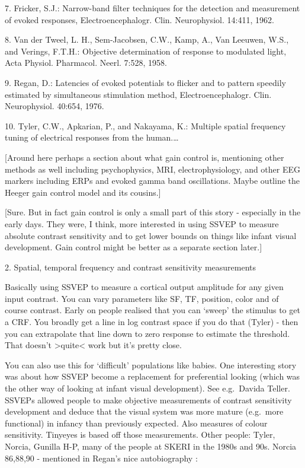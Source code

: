 \documentclass[
  letterpaper,
  DIV=11,
  numbers=noendperiod]{scrartcl}
\begin{document}
7. Fricker, S.J.: Narrow-band filter techniques for the detection and
measurement of evoked responses, Electroencephalogr. Clin. Neurophysiol.
14:411, 1962.

8. Van der Tweel, L. H., Sem-Jacobsen, C.W., Kamp, A., Van Leeuwen,
W.S., and Verings, F.T.H.: Objective determination of response to
modulated light, Acta Physiol. Pharmacol. Neerl. 7:528, 1958.

9. Regan, D.: Latencies of evoked potentials to flicker and to pattern
speedily estimated by simultaneous stimulation method,
Electroencephalogr. Clin. Neurophysiol. 40:654, 1976.

10. Tyler, C.W., Apkarian, P., and Nakayama, K.: Multiple spatial
frequency tuning of electrical responses from the human.\ldots{}

{[}Around here perhaps a section about what gain control is, mentioning
other methods as well including psychophysics, MRI, electrophysiology,
and other EEG markers including ERPs and evoked gamma band oscillations.
Maybe outline the Heeger gain control model and its cousins.{]}

{[}Sure. But in fact gain control is only a small part of this story -
especially in the early days. They were, I think, more interested in
using SSVEP to measure absolute contrast sensitivity and to get lower
bounds on things like infant visual development. Gain control might be
better as a separate section later.{]}

\label{anchor-4}{}2. Spatial, temporal frequency and
contrast sensitivity measurements

Basically using SSVEP to measure a cortical output amplitude for any
given input contrast. You can vary parameters like SF, TF, position,
color and of course contrast. Early on people realised that you can
`sweep' the stimulus to get a CRF. You broadly get a line in log
contrast space if you do that (Tyler) - then you can extrapolate that
line down to zero response to estimate the threshold. That doesn't
\textgreater quite\textless{} work but it's pretty close.

You can also use this for `difficult' populations like babies. One
interesting story was about how SSVEP become a replacement for
preferential looking (which was the other way of looking at infant
visual development). See e.g.~Davida Teller. SSVEPs allowed people to
make objective measurements of contrast sensitivity development and
deduce that the visual system was more mature (e.g.~more functional) in
infancy than previously expected. Also measures of colour sensitivity.
Tinyeyes is based off those measurements. Other people: Tyler, Norcia,
Gunilla H-P, many of the people at SKERI in the 1980s and 90s. Norcia
86,88,90 - mentioned in Regan's nice autobiography :
\end{document}
